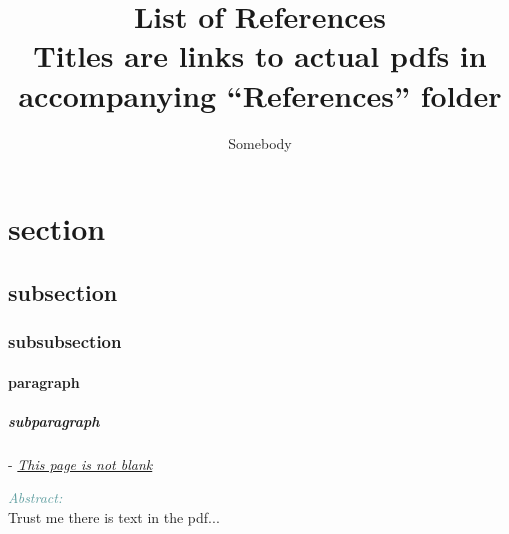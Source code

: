 \documentclass[]{article}
\title{List of References \\ \small Titles are links to actual pdfs in accompanying ``References'' folder}
\author{Somebody}
\newcommand{\paperentry}[4]{
            \hangindent=1cm
            \cite{#1} - \href{run:../References/#3}{\textcolor{Sepia}{\textit{#2}}}
            
            \noindent            
            \begin{minipage}[t]{0.1\linewidth}\hfill\end{minipage}
            \begin{minipage}[t]{0.8\linewidth}\textcolor{CadetBlue}{{\textit{Abstract:}}}\\#4\end{minipage}
            \vspace{.25cm}
          }
\begin{document}
\maketitle

\tableofcontents

\newpage

\section{section}

  \subsection{subsection}
  
    \subsubsection{subsubsection}
      
      \paragraph{paragraph}
        
        \subparagraph{subparagraph}
  
          \paperentry{junk}
                     {This page is not blank}
                     {blank.pdf}
                     {Trust me there is text in the pdf...} 
      
\newpage



\end{document}

